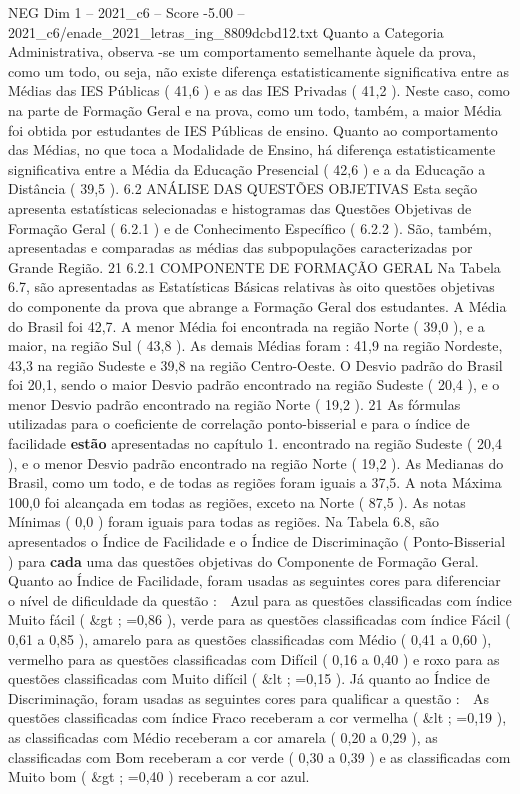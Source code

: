 \begin{textsample}{NEG Dim 1 – 2021\_c6 – Score -5.00 – 2021\_c6/enade\_2021\_letras\_ing\_8809dcbd12.txt}
Quanto a Categoria Administrativa, observa -se um comportamento semelhante àquele da prova, como um todo, ou seja, não existe diferença estatisticamente significativa entre as Médias das IES Públicas ( 41,6 ) e as das IES Privadas ( 41,2 ).
Neste caso, como na parte de Formação Geral e na prova, como um todo, também, a maior Média foi obtida por estudantes de IES Públicas de ensino.
Quanto ao comportamento das Médias, no que toca a Modalidade de Ensino, há diferença estatisticamente significativa entre a Média da Educação Presencial ( 42,6 ) e a da Educação a Distância ( 39,5 ). 6.2 ANÁLISE DAS QUESTÕES OBJETIVAS Esta seção apresenta estatísticas selecionadas e histogramas das Questões Objetivas de Formação Geral ( 6.2.1 ) e de Conhecimento Específico ( 6.2.2 ).
São, também, apresentadas e comparadas as médias das subpopulações caracterizadas por Grande Região. 21 6.2.1 COMPONENTE DE FORMAÇÃO GERAL Na Tabela 6.7, são apresentadas as Estatísticas Básicas relativas às oito questões objetivas do componente da prova que abrange a Formação Geral dos estudantes.
A Média do Brasil foi 42,7.
A menor Média foi encontrada na região Norte ( 39,0 ), e a maior, na região Sul ( 43,8 ).
As demais Médias foram : 41,9 na região Nordeste, 43,3 na região Sudeste e 39,8 na região Centro-Oeste.
O Desvio padrão do Brasil foi 20,1, sendo o maior Desvio padrão encontrado na região Sudeste ( 20,4 ), e o menor Desvio padrão encontrado na região Norte ( 19,2 ). 21 As fórmulas utilizadas para o coeficiente de correlação ponto-bisserial e para o índice de facilidade \textbf{estão} apresentadas no capítulo 1. encontrado na região Sudeste ( 20,4 ), e o menor Desvio padrão encontrado na região Norte ( 19,2 ).
As Medianas do Brasil, como um todo, e de todas as regiões foram iguais a 37,5.
A nota Máxima 100,0 foi alcançada em todas as regiões, exceto na Norte ( 87,5 ).
As notas Mínimas ( 0,0 ) foram iguais para todas as regiões.
Na Tabela 6.8, são apresentados o Índice de Facilidade e o Índice de Discriminação ( Ponto-Bisserial ) para \textbf{cada} uma das questões objetivas do Componente de Formação Geral.
Quanto ao Índice de Facilidade, foram usadas as seguintes cores para diferenciar o nível de dificuldade da questão :  Azul para as questões classificadas com índice Muito fácil ( \&gt ; =0,86 ), verde para as questões classificadas com índice Fácil ( 0,61 a 0,85 ), amarelo para as questões classificadas com Médio ( 0,41 a 0,60 ), vermelho para as questões classificadas com Difícil ( 0,16 a 0,40 ) e roxo para as questões classificadas com Muito difícil ( \&lt ; =0,15 ).
Já quanto ao Índice de Discriminação, foram usadas as seguintes cores para qualificar a questão :  As questões classificadas com índice Fraco receberam a cor vermelha ( \&lt ; =0,19 ), as classificadas com Médio receberam a cor amarela ( 0,20 a 0,29 ), as classificadas com Bom receberam a cor verde ( 0,30 a 0,39 ) e as classificadas com Muito bom ( \&gt ; =0,40 ) receberam a cor azul.

\end{textsample}
